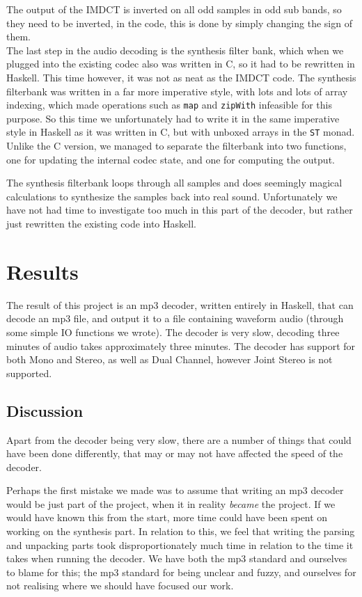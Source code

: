 \documentclass[a4paper,12pt]{article}
\begin{document}
        The output of the IMDCT is inverted on all odd samples in odd sub bands,
        so they need to be inverted, in the code, this is done by simply
        changing the sign of them. \\

        The last step in the audio decoding is the synthesis filter bank, which
        when we plugged into the existing codec also was written in C, so it had
        to be rewritten in Haskell. This time however, it was not as neat as the
        IMDCT code. The synthesis filterbank was written in a far more
        imperative style, with lots and lots of array indexing, which made
        operations such as \texttt{map} and \texttt{zipWith} infeasible for this
        purpose. So this time we unfortunately had to write it in the same
        imperative style in Haskell as it was written in C, but with unboxed
        arrays in the \texttt{ST} monad.  Unlike the C version, we managed to
        separate the filterbank into two functions, one for updating the
        internal codec state, and one for computing the output.

        The synthesis filterbank loops through all samples and does seemingly
        magical calculations to synthesize the samples back into real sound.
        Unfortunately we have not had time to investigate too much in this part
        of the decoder, but rather just rewritten the existing code into
        Haskell. 

\section{Results}
    The result of this project is an mp3 decoder, written entirely in Haskell,
    that can decode an mp3 file, and output it to a file containing waveform
    audio (through some simple IO functions we wrote). The decoder is very slow,
    decoding three minutes of audio takes approximately three minutes. The
    decoder has support for both Mono and Stereo, as well as Dual Channel,
    however Joint Stereo is not supported.

    \subsection{Discussion}
        Apart from the decoder being very slow, there are a number of things
        that could have been done differently, that may or may not have affected
        the speed of the decoder.

        Perhaps the first mistake we made was to assume that writing an mp3
        decoder would be just part of the project, when it in reality
        \textit{became} the project. If we would have known this from the start,
        more time could have been spent on working on the synthesis part. In
        relation to this, we feel that writing the parsing and unpacking parts
        took disproportionately much time in relation to the time it takes when
        running the decoder. We have both the mp3 standard and ourselves to
        blame for this; the mp3 standard for being unclear and fuzzy, and
        ourselves for not realising where we should have focused our work.
\end{document}
